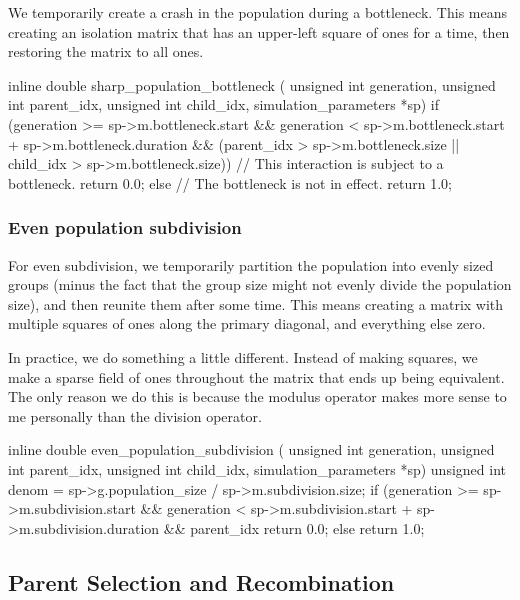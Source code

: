 \documentclass{article}
\begin{document}
	We temporarily create a crash in the population during a bottleneck.
	This means creating an isolation matrix that has an upper-left square of
	ones for a time, then restoring the matrix to all ones.

\begin{ccode}
inline double sharp_population_bottleneck (
    unsigned int generation, unsigned int parent_idx,
    unsigned int child_idx, simulation_parameters *sp) {
  if (generation >= sp->m.bottleneck.start &&
      generation < sp->m.bottleneck.start + sp->m.bottleneck.duration &&
      (parent_idx > sp->m.bottleneck.size ||
       child_idx > sp->m.bottleneck.size))
    // This interaction is subject to a bottleneck.
    return 0.0;
  else
    // The bottleneck is not in effect.
    return 1.0;
}
\end{ccode}

      \subsubsection{Even population subdivision}

	For even subdivision, we temporarily partition the population into
	evenly sized groups (minus the fact that the group size might not evenly
	divide the population size), and then reunite them after some time.
	This means creating a matrix with multiple squares of ones along the
	primary diagonal, and everything else zero.

	In practice, we do something a little different. Instead of making
	squares, we make a sparse field of ones throughout the matrix that ends
	up being equivalent. The only reason we do this is because the modulus
	operator makes more sense to me personally than the division operator.

\begin{ccode}
inline double even_population_subdivision (
    unsigned int generation, unsigned int parent_idx,
    unsigned int child_idx, simulation_parameters *sp) {
  unsigned int denom = sp->g.population_size / sp->m.subdivision.size;
  if (generation >= sp->m.subdivision.start &&
      generation < sp->m.subdivision.start + sp->m.subdivision.duration &&
      parent_idx %
    return 0.0;
  else
    return 1.0;
}
\end{ccode}

    \subsection{Parent Selection and Recombination}
\end{document}
